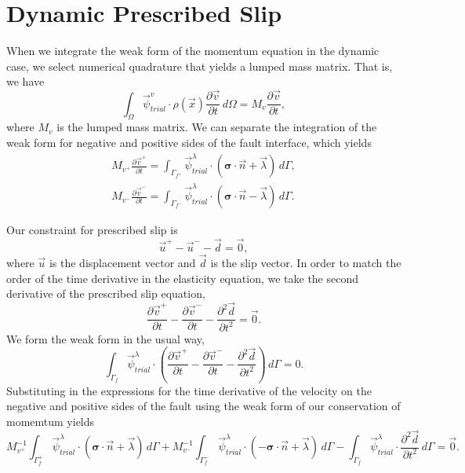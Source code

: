 \documentclass{article}
\newcommand{\trialvec}[1][]{{\vec{\psi}_\mathit{trial}^{#1}}}
\newcommand{\tensor}[1]{\bm{#1}}
\begin{document}
\section{Dynamic Prescribed Slip}

When we integrate the weak form of the momentum equation in the dynamic case, we select numerical quadrature that yields a lumped mass matrix.
That is, we have
\begin{equation}
  \int_\Omega \trialvec[v] \cdot \rho(\vec{x}) \frac{\partial \vec{v}}{\partial t} \, d\Omega = M_v \frac{\partial \vec{v}}{\partial t},
\end{equation}
where $M_v$ is the lumped mass matrix.
We can separate the integration of the weak form for negative and positive sides of the fault interface, which yields
\begin{gather}
  M_{v^+} \frac{\partial \vec{v}^+}{\partial t} = \int_{\Gamma_{f^+}} \trialvec[\lambda] \cdot \left( \tensor{\sigma} \cdot \vec{n} + \vec{\lambda} \right) \, d\Gamma, \\
  M_{v^-} \frac{\partial \vec{v}^-}{\partial t} = \int_{\Gamma_{f^-}} \trialvec[\lambda] \cdot \left( \tensor{\sigma} \cdot \vec{n} - \vec{\lambda} \right) \, d\Gamma.
\end{gather}

Our constraint for prescribed slip is
\begin{equation}
  \vec{u}^+ - \vec{u}^- - \vec{d} = \vec{0},
\end{equation}
where $\vec{u}$ is the displacement vector and $\vec{d}$ is the slip vector.
In order to match the order of the time derivative in the elasticity equation, we take the second derivative of the prescribed slip equation,
\begin{equation}
  \frac{\partial \vec{v}^+}{\partial t} - \frac{\partial \vec{v}^-}{\partial t} - \frac{\partial^2 \vec{d}}{\partial t^2} = \vec{0}.
\end{equation}
We form the weak form in the usual way,
\begin{equation}
  \int_{\Gamma_f} \trialvec[\lambda] \cdot \left( \frac{\partial \vec{v}^+}{\partial t} - \frac{\partial \vec{v}^-}{\partial t} - \frac{\partial^2 \vec{d}}{\partial t^2} \right) \, d\Gamma = 0.
\end{equation}
Substituting in the expressions for the time derivative of the velocity on the negative and positive sides of the fault using the weak form of our conservation of momemtum yields
\begin{equation}
M_{v^+}^{-1} \int_{\Gamma_f^+} \trialvec[\lambda] \cdot \left(\tensor{\sigma} \cdot \vec{n} + \vec{\lambda}\right) \, d\Gamma + M_{v^-}^{-1} \int_{\Gamma_f^-} \trialvec[\lambda] \cdot \left( -\tensor{\sigma} \cdot \vec{n} + \vec{\lambda} \right) \, d\Gamma - \int_{\Gamma_f} \trialvec[\lambda] \cdot \frac{\partial^2 \vec{d}}{\partial t^2} \, d\Gamma = \vec{0}.
\end{equation}
\end{document}
